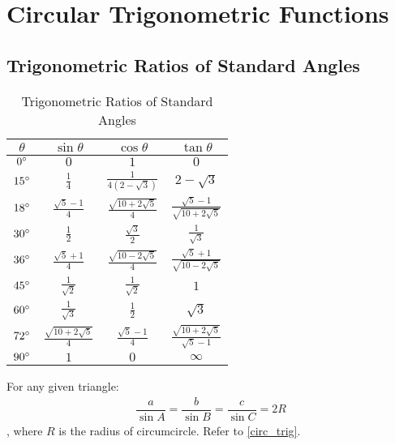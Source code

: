 \documentclass[../main.tex]{subfile}
\begin{document}
    \chapter{Circular Trigonometric Functions}

        \section{Trigonometric Ratios of Standard Angles}
        \begin{table}[h!]
            \centering
            \caption{Trigonometric Ratios of Standard Angles}
            \begin{tabular}{c|ccc}
                $\theta$ & $\sin \theta$ & $\cos \theta$ & $\tan \theta$ \\
                \hline
                $0 \degree$ & $0$ & $1$ & $0$ \\
                $15 \degree$ & $\frac{1}{4}$ & $\frac{1}{4(2-\sqrt{3})}$ & $2-\sqrt{3}$\\
                $18 \degree$ & $\frac{\sqrt{5}-1}{4}$ & $\frac{\sqrt{10+2\sqrt{5}}}{4}$ & $\frac{\sqrt{5}-1}{\sqrt{10+2\sqrt{5}}}$ \\
                $30 \degree$ & $\frac{1}{2}$ & $\frac{\sqrt{3}}{2}$ & $\frac{1}{\sqrt{3}}$\\
                $36 \degree$ & $\frac{\sqrt{5}+1}{4}$ & $\frac{\sqrt{10-2\sqrt{5}}}{4}$ & $\frac{\sqrt{5}+1}{\sqrt{10-2\sqrt{5}}}$ \\
                $45 \degree$ & $\frac{1}{\sqrt{2}}$ & $\frac{1}{\sqrt{2}}$ & $1$ \\
                $60 \degree$ & $\frac{1}{\sqrt{3}}$ & $\frac{1}{2}$ & $\sqrt{3}$ \\
                $72 \degree$ & $\frac{\sqrt{10+2\sqrt{5}}}{4}$ & $\frac{\sqrt{5}-1}{4}$ & $\frac{\sqrt{10+2\sqrt{5}}}{\sqrt{5}-1}$ \\
                $90 \degree$ & $1$ & $0$ & $\infty$ \\
                \hline
            \end{tabular}
        \end{table}
        
        For any given triangle:
        \begin{align}
        \dfrac{a}{\sin A} = \dfrac{b}{\sin B} = \dfrac{c}{\sin C} = 2R
        \end{align}, where $R$ is the radius of circumcircle. Refer to \ref{circ_trig}.
        
\end{document}
